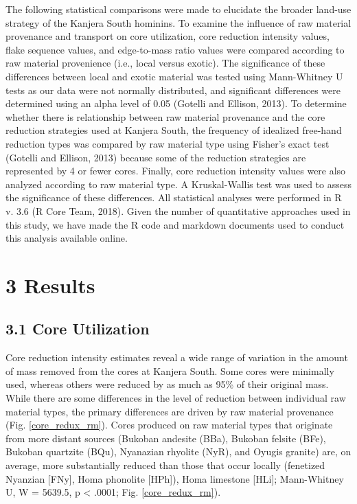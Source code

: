 \documentclass[]{elsarticle} %
\begin{document}
The following statistical comparisons were made to elucidate the broader
land-use strategy of the Kanjera South hominins. To examine the
influence of raw material provenance and transport on core utilization,
core reduction intensity values, flake sequence values, and edge-to-mass
ratio values were compared according to raw material provenience (i.e.,
local versus exotic). The significance of these differences between
local and exotic material was tested using Mann-Whitney U tests as our
data were not normally distributed, and significant differences were
determined using an alpha level of 0.05 (\hspace{0pt}Gotelli and
Ellison, 2013\hspace{0pt}). To determine whether there is relationship
between raw material provenance and the core reduction strategies used
at Kanjera South, the frequency of idealized free-hand reduction types
was compared by raw material type using Fisher's exact test
(\hspace{0pt}Gotelli and Ellison, 2013\hspace{0pt}) because some of the
reduction strategies are represented by 4 or fewer cores. Finally, core
reduction intensity values were also analyzed according to raw material
type. A Kruskal-Wallis test was used to assess the significance of these
differences. All statistical analyses were performed in R v. 3.6
(\hspace{0pt}R Core Team, 2018\hspace{0pt}). Given the number of
quantitative approaches used in this study, we have made the R code and
markdown documents used to conduct this analysis available online.

\hypertarget{results}{%
\section{3 Results}\label{results}}

\hypertarget{core-utilization}{%
\subsection{3.1 Core Utilization}\label{core-utilization}}

Core reduction intensity estimates reveal a wide range of variation in
the amount of mass removed from the cores at Kanjera South. Some cores
were minimally used, whereas others were reduced by as much as 95\% of
their original mass. While there are some differences in the level of
reduction between individual raw material types, the primary differences
are driven by raw material provenance (\hspace{0pt}Fig.
\ref{core_redux_rm}\hspace{0pt}). Cores produced on raw material types
that originate from more distant sources (Bukoban andesite (BBa),
Bukoban felsite (BFe), Bukoban quartzite (BQu), Nyanazian rhyolite
(NyR), and Oyugis granite) are, on average, more substantially reduced
than those that occur locally (fenetized Nyanzian {[}FNy{]}, Homa
phonolite {[}HPh{]}), Homa limestone {[}HLi{]}; Mann-Whitney U, W =
5639.5, p \textless{} .0001; Fig. \ref{core_redux_rm}).
\end{document}
